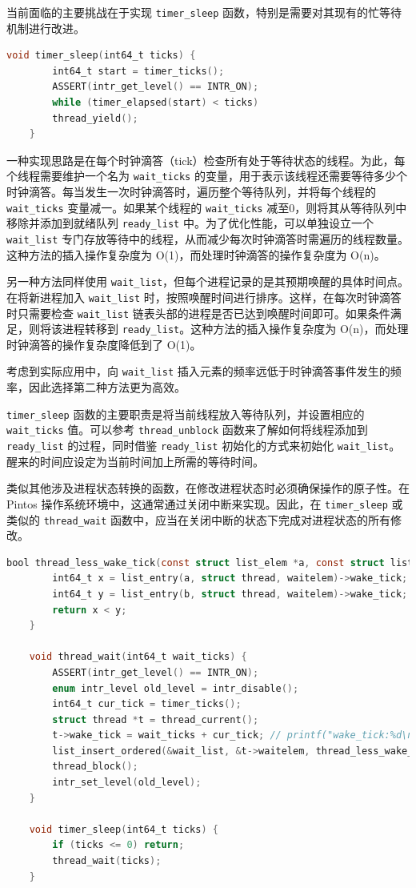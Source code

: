 \documentclass{article}
\begin{document}
当前面临的主要挑战在于实现 \texttt{timer\_sleep} 函数，特别是需要对其现有的忙等待机制进行改进。

\begin{lstlisting}[language=C, title=\texttt{timer\_sleep}]
	void timer_sleep(int64_t ticks) {
		int64_t start = timer_ticks();
		ASSERT(intr_get_level() == INTR_ON);
		while (timer_elapsed(start) < ticks)
		thread_yield();
	}
\end{lstlisting}

一种实现思路是在每个时钟滴答（tick）检查所有处于等待状态的线程。为此，每个线程需要维护一个名为 \texttt{wait\_ticks} 的变量，用于表示该线程还需要等待多少个时钟滴答。每当发生一次时钟滴答时，遍历整个等待队列，并将每个线程的 \texttt{wait\_ticks} 变量减一。如果某个线程的 \texttt{wait\_ticks} 减至0，则将其从等待队列中移除并添加到就绪队列 \texttt{ready\_list} 中。为了优化性能，可以单独设立一个 \texttt{wait\_list} 专门存放等待中的线程，从而减少每次时钟滴答时需遍历的线程数量。这种方法的插入操作复杂度为 O(1)，而处理时钟滴答的操作复杂度为 O(n)。

另一种方法同样使用 \texttt{wait\_list}，但每个进程记录的是其预期唤醒的具体时间点。在将新进程加入 \texttt{wait\_list} 时，按照唤醒时间进行排序。这样，在每次时钟滴答时只需要检查 \texttt{wait\_list} 链表头部的进程是否已达到唤醒时间即可。如果条件满足，则将该进程转移到 \texttt{ready\_list}。这种方法的插入操作复杂度为 O(n)，而处理时钟滴答的操作复杂度降低到了 O(1)。

考虑到实际应用中，向 \texttt{wait\_list} 插入元素的频率远低于时钟滴答事件发生的频率，因此选择第二种方法更为高效。

\texttt{timer\_sleep} 函数的主要职责是将当前线程放入等待队列，并设置相应的 \texttt{wait\_ticks} 值。可以参考 \texttt{thread\_unblock} 函数来了解如何将线程添加到 \texttt{ready\_list} 的过程，同时借鉴 \texttt{ready\_list} 初始化的方式来初始化 \texttt{wait\_list}。醒来的时间应设定为当前时间加上所需的等待时间。

类似其他涉及进程状态转换的函数，在修改进程状态时必须确保操作的原子性。在 Pintos 操作系统环境中，这通常通过关闭中断来实现。因此，在 \texttt{timer\_sleep} 或类似的 \texttt{thread\_wait} 函数中，应当在关闭中断的状态下完成对进程状态的所有修改。

\begin{lstlisting}[language=C, title=\texttt{thread\_wait}]
	bool thread_less_wake_tick(const struct list_elem *a, const struct list_elem *b, void *aux) {
		int64_t x = list_entry(a, struct thread, waitelem)->wake_tick;
		int64_t y = list_entry(b, struct thread, waitelem)->wake_tick;
		return x < y;
	}
	
	void thread_wait(int64_t wait_ticks) {
		ASSERT(intr_get_level() == INTR_ON);
		enum intr_level old_level = intr_disable();
		int64_t cur_tick = timer_ticks();
		struct thread *t = thread_current();
		t->wake_tick = wait_ticks + cur_tick; // printf("wake_tick:%d\n", t->wake_tick);
		list_insert_ordered(&wait_list, &t->waitelem, thread_less_wake_tick, NULL);
		thread_block();
		intr_set_level(old_level);
	}
	
	void timer_sleep(int64_t ticks) {
		if (ticks <= 0) return;
		thread_wait(ticks);
	}
\end{lstlisting}
\end{document}
